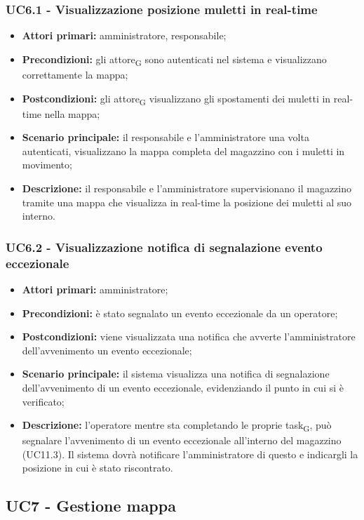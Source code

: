 \subsubsection{UC6.1 - Visualizzazione posizione muletti in real-time}
\begin{itemize}
	\item 	\textbf{Attori primari:} amministratore, responsabile;
	\item 	\textbf{Precondizioni:} gli attore\textsubscript{G} sono autenticati nel sistema e visualizzano correttamente la mappa;
	\item 	\textbf{Postcondizioni:} gli attore\textsubscript{G} visualizzano gli spostamenti dei muletti in real-time nella mappa;
	\item 	\textbf{Scenario principale:} il responsabile e l'amministratore una volta autenticati, visualizzano la mappa completa del magazzino con i muletti in movimento;
	\item 	\textbf{Descrizione:} il responsabile e l'amministratore supervisionano il magazzino tramite una mappa che visualizza in real-time la posizione dei muletti al suo interno.
\end{itemize}

\subsubsection{UC6.2 - Visualizzazione notifica di segnalazione evento eccezionale}
\begin{itemize}
	\item 	\textbf{Attori primari:} amministratore;
	\item 	\textbf{Precondizioni:} è stato segnalato un evento eccezionale da un operatore;
	\item 	\textbf{Postcondizioni:} viene visualizzata una notifica che avverte l'amministratore dell'avvenimento un evento eccezionale;
	\item 	\textbf{Scenario principale:} il sistema visualizza una notifica di segnalazione dell'avvenimento di un evento eccezionale, evidenziando il punto in cui si è verificato;
	\item 	\textbf{Descrizione:} l'operatore mentre sta completando le proprie task\textsubscript{G}, può segnalare l'avvenimento di un evento eccezionale all'interno del magazzino (UC11.3). Il sistema dovrà notificare l'amministratore di questo e indicargli la posizione in cui è stato riscontrato.
\end{itemize}

\subsection{UC7 - Gestione mappa}

